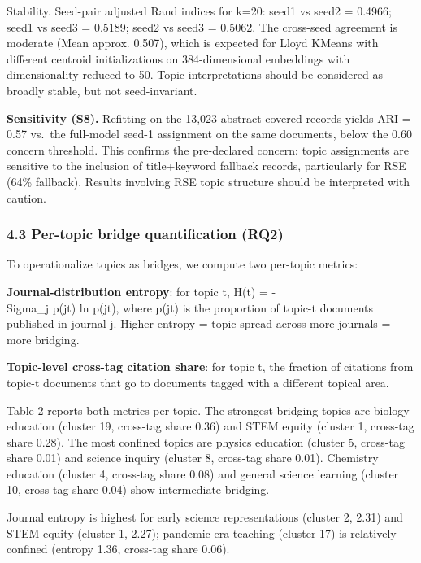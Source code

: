 \documentclass[pdflatex,sn-apa]{sn-jnl}
\begin{document}
Stability. Seed-pair adjusted Rand indices for k=20: seed1 vs seed2 =
0.4966; seed1 vs seed3 = 0.5189; seed2 vs seed3 = 0.5062. The cross-seed
agreement is moderate (Mean approx. 0.507), which is expected for Lloyd
KMeans with different centroid initializations on 384-dimensional
embeddings with dimensionality reduced to 50. Topic interpretations
should be considered as broadly stable, but not seed-invariant.

\textbf{Sensitivity (S8).} Refitting on the 13,023 abstract-covered
records yields ARI = 0.57 vs.~the full-model seed-1 assignment on the
same documents, below the 0.60 concern threshold. This confirms the
pre-declared concern: topic assignments are sensitive to the inclusion
of title+keyword fallback records, particularly for RSE (64\% fallback).
Results involving RSE topic structure should be interpreted with
caution.

\subsubsection{4.3 Per-topic bridge quantification
(RQ2)}\label{per-topic-bridge-quantification-rq2}

To operationalize topics as bridges, we compute two per-topic metrics:

\textbf{Journal-distribution entropy}: for topic t, H(t) = -\\Sigma\_j
p(j\textbar t) ln p(j\textbar t), where p(j\textbar t) is the proportion
of topic-t documents published in journal j. Higher entropy = topic
spread across more journals = more bridging.

\textbf{Topic-level cross-tag citation share}: for topic t, the fraction
of citations from topic-t documents that go to documents tagged with a
different topical area.

Table 2 reports both metrics per topic. The strongest bridging topics
are biology education (cluster 19, cross-tag share 0.36) and STEM equity
(cluster 1, cross-tag share 0.28). The most confined topics are physics
education (cluster 5, cross-tag share 0.01) and science inquiry (cluster
8, cross-tag share 0.01). Chemistry education (cluster 4, cross-tag
share 0.08) and general science learning (cluster 10, cross-tag share
0.04) show intermediate bridging.

Journal entropy is highest for early science representations (cluster 2,
2.31) and STEM equity (cluster 1, 2.27); pandemic-era teaching (cluster
17) is relatively confined (entropy 1.36, cross-tag share 0.06).
\end{document}
